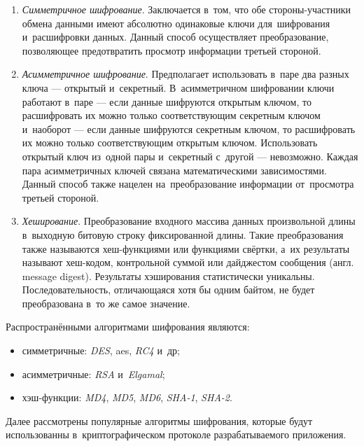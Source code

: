\begin{enumerate}
	\item \emph{Симметричное шифрование}. Заключается в~том, что обе стороны-участники обмена данными имеют абсолютно одинаковые ключи для~шифрования и~расшифровки данных. Данный способ осуществляет преобразование, позволяющее предотвратить просмотр информации третьей стороной.
	\item \emph{Асимметричное шифрование}. Предполагает использовать в~паре два разных ключа — открытый и~секретный. В~асимметричном шифровании ключи работают в~паре — если данные шифруются открытым ключом, то расшифровать их можно только соответствующим секретным ключом и~наоборот — если данные шифруются секретным ключом, то расшифровать их можно только соответствующим открытым ключом. Использовать открытый ключ из~одной пары и~секретный с~другой — невозможно. Каждая пара асимметричных ключей связана математическими зависимостями. Данный способ также нацелен на~преобразование информации от~просмотра третьей стороной.
	\item \emph{Хеширование}. Преобразование входного массива данных произвольной длины в~выходную битовую строку фиксированной длины. Такие преобразования также называются хеш-функциями или функциями свёртки, а~их результаты называют хеш-кодом, контрольной суммой или дайджестом сообщения (англ. message digest). Результаты хэширования статистически уникальны. Последовательность, отличающаяся хотя бы одним байтом, не будет преобразована в~то же самое значение.
\end{enumerate}

Распространёнными алгоритмами шифрования являются:

\begin{itemize}
	\item симметричные: \textit{DES}, \gls{aes}, \textit{RC4} и~др;
	\item асимметричные: \textit{RSA} и~\textit{Elgamal};
	\item хэш-функции: \textit{MD4}, \textit{MD5}, \textit{MD6}, \textit{SHA-1}, \textit{SHA-2}.
\end{itemize}

Далее рассмотрены популярные алгоритмы шифрования, которые будут использованны в~криптографическом протоколе разрабатываемого приложения.